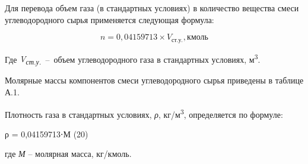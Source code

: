 \begin{multicols}{2}
Для перевода объем газа (в стандартных условиях) в количество вещества
смеси углеводородного сырья применяется следующая формула:

\begin{equation}
n = 0,04159713 \times V_{\text{ст.у.}}, \text{кмоль}
\end{equation}

Где \emph{V\textsubscript{ст.у.}}~--~объем углеводородного газа в
стандартных условиях, м\textsuperscript{3}.

Молярные массы компонентов смеси углеводородного сырья приведены в
таблице А.1.

Плотность газа в стандартных условиях, \emph{ρ},
кг/м\textsuperscript{3}, определяется по формуле:

ρ = 0,04159713⋅М (20)

где \emph{М} -- молярная масса, кг/кмоль.


\end{multicols}
